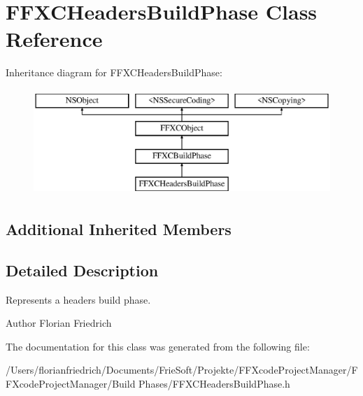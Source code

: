 \hypertarget{interface_f_f_x_c_headers_build_phase}{\section{F\-F\-X\-C\-Headers\-Build\-Phase Class Reference}
\label{interface_f_f_x_c_headers_build_phase}
}
Inheritance diagram for F\-F\-X\-C\-Headers\-Build\-Phase\-:\begin{figure}[H]
\begin{center}
\leavevmode
\includegraphics[height=4.000000cm]{interface_f_f_x_c_headers_build_phase}
\end{center}
\end{figure}
\subsection*{Additional Inherited Members}


\subsection{Detailed Description}
Represents a headers build phase. \begin{DoxyAuthor}{Author}
Florian Friedrich 
\end{DoxyAuthor}


The documentation for this class was generated from the following file\-:\begin{DoxyCompactItemize}
\item 
/\-Users/florianfriedrich/\-Documents/\-Frie\-Soft/\-Projekte/\-F\-F\-Xcode\-Project\-Manager/\-F\-F\-Xcode\-Project\-Manager/\-Build Phases/F\-F\-X\-C\-Headers\-Build\-Phase.\-h\end{DoxyCompactItemize}
